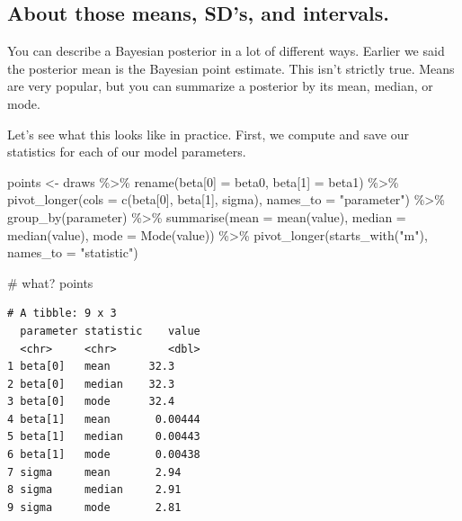 \documentclass[
  letterpaper,
  DIV=11,
  numbers=noendperiod]{scrartcl}
\newenvironment{Shaded}{\begin{snugshade}}{\end{snugshade}}
\newcommand{\AttributeTok}[1]{\textcolor[rgb]{0.40,0.45,0.13}{#1}}
\newcommand{\CommentTok}[1]{\textcolor[rgb]{0.37,0.37,0.37}{#1}}
\newcommand{\FunctionTok}[1]{\textcolor[rgb]{0.28,0.35,0.67}{#1}}
\newcommand{\NormalTok}[1]{\textcolor[rgb]{0.00,0.23,0.31}{#1}}
\newcommand{\OtherTok}[1]{\textcolor[rgb]{0.00,0.23,0.31}{#1}}
\newcommand{\SpecialCharTok}[1]{\textcolor[rgb]{0.37,0.37,0.37}{#1}}
\newcommand{\StringTok}[1]{\textcolor[rgb]{0.13,0.47,0.30}{#1}}
\begin{document}
\subsection{About those means, SD's, and
intervals.}\label{about-those-means-sds-and-intervals.}

You can describe a Bayesian posterior in a lot of different ways.
Earlier we said the posterior mean is the Bayesian point estimate. This
isn't strictly true. Means are very popular, but you can summarize a
posterior by its mean, median, or mode.

Let's see what this looks like in practice. First, we compute and save
our statistics for each of our model parameters.

\begin{Shaded}
\begin{Highlighting}[]
\NormalTok{points }\OtherTok{\textless{}{-}}\NormalTok{ draws }\SpecialCharTok{\%\textgreater{}\%} 
  \FunctionTok{rename}\NormalTok{(}\StringTok{\textasciigrave{}}\AttributeTok{beta[0]}\StringTok{\textasciigrave{}} \OtherTok{=}\NormalTok{ beta0,}
         \StringTok{\textasciigrave{}}\AttributeTok{beta[1]}\StringTok{\textasciigrave{}} \OtherTok{=}\NormalTok{ beta1) }\SpecialCharTok{\%\textgreater{}\%} 
  \FunctionTok{pivot\_longer}\NormalTok{(}\AttributeTok{cols =} \FunctionTok{c}\NormalTok{(}\StringTok{\textasciigrave{}}\AttributeTok{beta[0]}\StringTok{\textasciigrave{}}\NormalTok{, }\StringTok{\textasciigrave{}}\AttributeTok{beta[1]}\StringTok{\textasciigrave{}}\NormalTok{, sigma), }
               \AttributeTok{names\_to =} \StringTok{"parameter"}\NormalTok{) }\SpecialCharTok{\%\textgreater{}\%} 
  \FunctionTok{group\_by}\NormalTok{(parameter) }\SpecialCharTok{\%\textgreater{}\%} 
  \FunctionTok{summarise}\NormalTok{(}\AttributeTok{mean =} \FunctionTok{mean}\NormalTok{(value),}
            \AttributeTok{median =} \FunctionTok{median}\NormalTok{(value),}
            \AttributeTok{mode =} \FunctionTok{Mode}\NormalTok{(value)) }\SpecialCharTok{\%\textgreater{}\%} 
  \FunctionTok{pivot\_longer}\NormalTok{(}\FunctionTok{starts\_with}\NormalTok{(}\StringTok{"m"}\NormalTok{), }\AttributeTok{names\_to =} \StringTok{"statistic"}\NormalTok{)}

\CommentTok{\# what?}
\NormalTok{points}
\end{Highlighting}
\end{Shaded}

\begin{verbatim}
# A tibble: 9 x 3
  parameter statistic    value
  <chr>     <chr>        <dbl>
1 beta[0]   mean      32.3    
2 beta[0]   median    32.3    
3 beta[0]   mode      32.4    
4 beta[1]   mean       0.00444
5 beta[1]   median     0.00443
6 beta[1]   mode       0.00438
7 sigma     mean       2.94   
8 sigma     median     2.91   
9 sigma     mode       2.81   
\end{verbatim}
\end{document}
